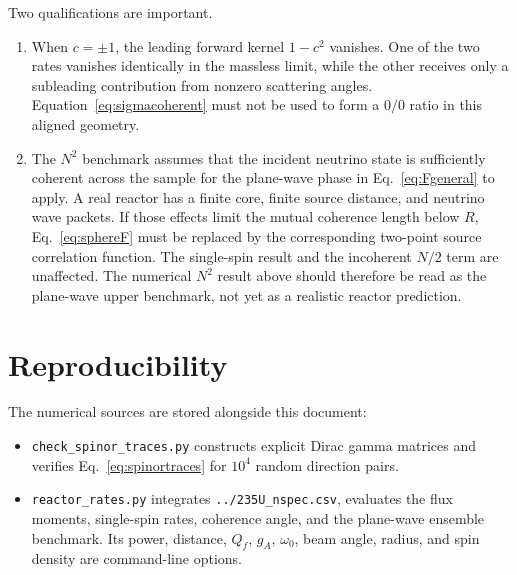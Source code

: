\documentclass[aps,prd,10pt,onecolumn,nofootinbib,amsmath,amssymb]{revtex4-1}
\begin{document}
Two qualifications are important.
\begin{enumerate}
  \item When \(c=\pm1\), the leading forward kernel \(1-c^2\) vanishes.
  One of the two rates vanishes identically in the massless limit, while
  the other receives only a subleading contribution from nonzero
  scattering angles.  Equation~\eqref{eq:sigmacoherent} must not be used
  to form a \(0/0\) ratio in this aligned geometry.
  \item The \(N^2\) benchmark assumes that the incident neutrino state is
  sufficiently coherent across the sample for the plane-wave phase in
  Eq.~\eqref{eq:Fgeneral} to apply.  A real reactor has a finite core,
  finite source distance, and neutrino wave packets.  If those effects
  limit the mutual coherence length below \(R\), Eq.~\eqref{eq:sphereF}
  must be replaced by the corresponding two-point source correlation
  function.  The single-spin result and the incoherent \(N/2\) term are
  unaffected.  The numerical \(N^2\) result above should therefore be
  read as the plane-wave upper benchmark, not yet as a realistic reactor
  prediction.
\end{enumerate}

\section{Reproducibility}

The numerical sources are stored alongside this document:
\begin{itemize}
  \item \texttt{check\_spinor\_traces.py} constructs explicit Dirac gamma
  matrices and verifies Eq.~\eqref{eq:spinortraces} for \(10^4\) random
  direction pairs.
  \item \texttt{reactor\_rates.py} integrates
  \texttt{../235U\_nspec.csv}, evaluates the flux moments, single-spin
  rates, coherence angle, and the plane-wave ensemble benchmark.  Its
  power, distance, \(Q_f\), \(g_A\), \(\omega_0\), beam angle, radius, and
  spin density are command-line options.
\end{itemize}
\end{document}

